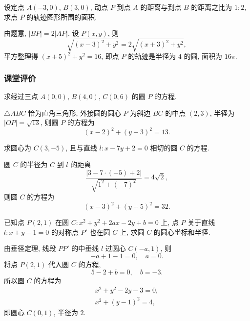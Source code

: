 \lianxi
\begin{exercise}[s]
    设定点 $A(-3,0)$, $B(3,0)$, 动点 $P$ 到点 $A$ 的距离与到点 $B$ 的距离之比为 $1:2$, 求点 $P$ 的轨迹图形所围的面积.
\end{exercise}
\beginsolution
    由题意, $|BP|= 2|AP|$. 设 $P(x,y)$, 则
    \[\sqrt{(x-3)^2+ y^2}= 2\sqrt{(x+3)^2+ y^2},\]
    平方整理得 $(x+5)^2+ y^2= 16$, 即点 $P$ 的轨迹是半径为 $4$ 的圆, 面积为 $16\pi$.
\endsolution

\subsubsection{课堂评价}
\begin{exercise}
    求经过三点 $A(0,0)$, $B(4,0)$, $C(0,6)$ 的圆 $P$ 的方程.
\end{exercise}
\beginsolution
    $\triangle ABC$ 恰为直角三角形,
    外接圆的圆心 $P$ 为斜边 $BC$ 的中点 $(2,3)$, 半径为 $|OP|= \sqrt{13}$, 则圆 $P$ 的方程为
    \[(x-2)^2+ (y-3)^2= 13.\]
\endsolution

\begin{exercise}
    求圆心为 $C(3, -5)$, 且与直线 $l\colon x-7y+2=0$ 相切的圆 $C$ 的方程.
\end{exercise}
\beginsolution
    圆 $C$ 的半径为 $C$ 到 $l$ 的距离
    \[\frac{|3- 7\cdot(-5)+ 2|}{\sqrt{1^2+(-7)^2}}= 4\sqrt2,\]
    则圆 $C$ 的方程为
    \[(x-3)^2+ (y+5)^2= 32.\]
\endsolution

\begin{exercise}
    已知点 $P(2, 1)$ 在圆 $C\colon x^2 +y^2 +2ax-2y+b=0$ 上, 点 $P$ 关于直线 $l\colon x+y-1=0$ 的对称点 $P'$ 也在圆 $C$ 上, 求圆 $C$ 的圆心坐标和半径.
\end{exercise}
\beginsolution
    由垂径定理, 线段 $PP'$ 的中垂线 $l$ 过圆心 $C(-a,1)$, 则
    \[-a+1-1=0,\quad a=0.\]
    将点 $P(2,1)$ 代入圆 $C$ 的方程,
    \[5-2+b= 0,\quad b=-3.\]
    所以圆 $C$ 的方程为
    \[\begin{gathered}
        x^2+y^2-2y-3= 0,\\
        x^2+ (y-1)^2= 4,
    \end{gathered}\]
    即圆心 $C(0,1)$, 半径为 $2$.
\endsolution

